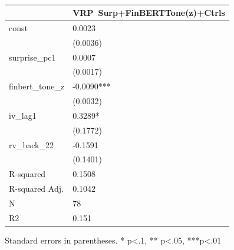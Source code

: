 \begin{table}
\caption{}
\label{}
\begin{center}
\begin{tabular}{ll}
\hline
                 & VRP~Surp+FinBERTTone(z)+Ctrls  \\
\hline
const            & 0.0023                         \\
                 & (0.0036)                       \\
surprise\_pc1    & 0.0007                         \\
                 & (0.0017)                       \\
finbert\_tone\_z & -0.0090***                     \\
                 & (0.0032)                       \\
iv\_lag1         & 0.3289*                        \\
                 & (0.1772)                       \\
rv\_back\_22     & -0.1591                        \\
                 & (0.1401)                       \\
R-squared        & 0.1508                         \\
R-squared Adj.   & 0.1042                         \\
N                & 78                             \\
R2               & 0.151                          \\
\hline
\end{tabular}
\end{center}
\end{table}
\bigskip
Standard errors in parentheses. \newline 
* p<.1, ** p<.05, ***p<.01
